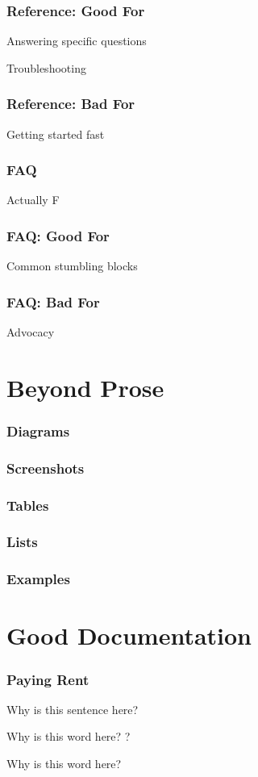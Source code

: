 \begin{frame}
\frametitle{Reference: Good For}

Answering specific questions

Troubleshooting
\end{frame}


\begin{frame}
\frametitle{Reference: Bad For}
Getting started fast
\end{frame}

\begin{frame}
\frametitle{FAQ}
Actually F
\end{frame}

\begin{frame}
\frametitle{FAQ: Good For}

Common stumbling blocks
\end{frame}

\begin{frame}
\frametitle{FAQ: Bad For}
Advocacy
\end{frame}


\section{Beyond Prose}


\begin{frame}
\frametitle{Diagrams}
\end{frame}

\begin{frame}
\frametitle{Screenshots}
\end{frame}

\begin{frame}
\frametitle{Tables}
\end{frame}

\begin{frame}
\frametitle{Lists}
\end{frame}

\begin{frame}
\frametitle{Examples}
\end{frame}

\section{Good Documentation}


\begin{frame}
\frametitle{Paying Rent}

Why is this sentence here?

Why is this word here?
?

Why is this word here?

\end{frame}

